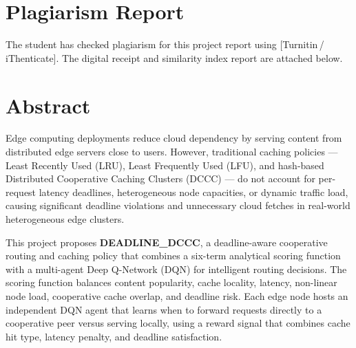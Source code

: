\documentclass[12pt,a4paper]{report}
\begin{document}
\clearpage


\chapter*{Plagiarism Report}

The student has checked plagiarism for this project report using [Turnitin\,/\,iThenticate].
The digital receipt and similarity index report are attached below.

\vspace{1cm}
\begin{center}
\end{center}
\clearpage


\chapter*{Abstract}

Edge computing deployments reduce cloud dependency by serving content from distributed
edge servers close to users. However, traditional caching policies --- Least Recently Used
(LRU), Least Frequently Used (LFU), and hash-based Distributed Cooperative Caching
Clusters (DCCC) --- do not account for per-request latency deadlines, heterogeneous node
capacities, or dynamic traffic load, causing significant deadline violations and unnecessary
cloud fetches in real-world heterogeneous edge clusters.

This project proposes \textbf{DEADLINE\_DCCC}, a deadline-aware cooperative routing and
caching policy that combines a six-term analytical scoring function with a multi-agent Deep
Q-Network (DQN) for intelligent routing decisions. The scoring function balances content
popularity, cache locality, latency, non-linear node load, cooperative cache overlap, and
deadline risk. Each edge node hosts an independent DQN agent that learns when to forward
requests directly to a cooperative peer versus serving locally, using a reward signal that
combines cache hit type, latency penalty, and deadline satisfaction.
\end{document}
